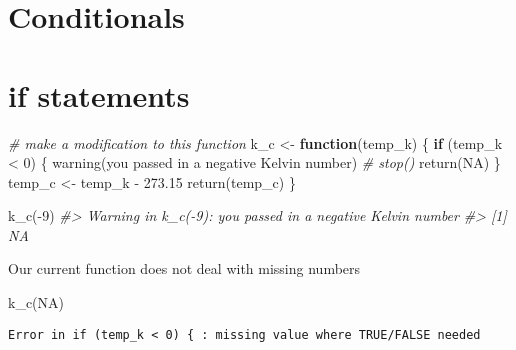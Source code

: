 \documentclass[
]{book}
\newenvironment{Shaded}{\begin{snugshade}}{\end{snugshade}}
\newcommand{\CommentTok}[1]{\textcolor[rgb]{0.56,0.35,0.01}{\textit{#1}}}
\newcommand{\ConstantTok}[1]{\textcolor[rgb]{0.00,0.00,0.00}{#1}}
\newcommand{\ControlFlowTok}[1]{\textcolor[rgb]{0.13,0.29,0.53}{\textbf{#1}}}
\newcommand{\DecValTok}[1]{\textcolor[rgb]{0.00,0.00,0.81}{#1}}
\newcommand{\FloatTok}[1]{\textcolor[rgb]{0.00,0.00,0.81}{#1}}
\newcommand{\FunctionTok}[1]{\textcolor[rgb]{0.00,0.00,0.00}{#1}}
\newcommand{\NormalTok}[1]{#1}
\newcommand{\OtherTok}[1]{\textcolor[rgb]{0.56,0.35,0.01}{#1}}
\newcommand{\SpecialCharTok}[1]{\textcolor[rgb]{0.00,0.00,0.00}{#1}}
\newcommand{\StringTok}[1]{\textcolor[rgb]{0.31,0.60,0.02}{#1}}
\begin{document}
\hypertarget{conditionals}{%
\section{Conditionals}\label{conditionals}}

\hypertarget{if-statements}{%
\section{if statements}\label{if-statements}}

\begin{Shaded}
\begin{Highlighting}[]
\CommentTok{\# make a modification to this function}
\NormalTok{k\_c }\OtherTok{\textless{}{-}} \ControlFlowTok{function}\NormalTok{(temp\_k) \{}
    \ControlFlowTok{if}\NormalTok{ (temp\_k }\SpecialCharTok{\textless{}} \DecValTok{0}\NormalTok{) \{}
        \FunctionTok{warning}\NormalTok{(}\StringTok{\textquotesingle{}you passed in a negative Kelvin number\textquotesingle{}}\NormalTok{)}
        \CommentTok{\# stop()}
        \FunctionTok{return}\NormalTok{(}\ConstantTok{NA}\NormalTok{)}
\NormalTok{    \}}
\NormalTok{    temp\_c }\OtherTok{\textless{}{-}}\NormalTok{ temp\_k }\SpecialCharTok{{-}} \FloatTok{273.15}
    \FunctionTok{return}\NormalTok{(temp\_c)}
\NormalTok{\}}
\end{Highlighting}
\end{Shaded}

\begin{Shaded}
\begin{Highlighting}[]
\FunctionTok{k\_c}\NormalTok{(}\SpecialCharTok{{-}}\DecValTok{9}\NormalTok{)}
\CommentTok{\#\textgreater{} Warning in k\_c({-}9): you passed in a negative Kelvin number}
\CommentTok{\#\textgreater{} [1] NA}
\end{Highlighting}
\end{Shaded}

Our current function does not deal with missing numbers

\begin{Shaded}
\begin{Highlighting}[]
\FunctionTok{k\_c}\NormalTok{(}\ConstantTok{NA}\NormalTok{)}
\end{Highlighting}
\end{Shaded}

\begin{verbatim}
Error in if (temp_k < 0) { : missing value where TRUE/FALSE needed
\end{verbatim}
\end{document}
